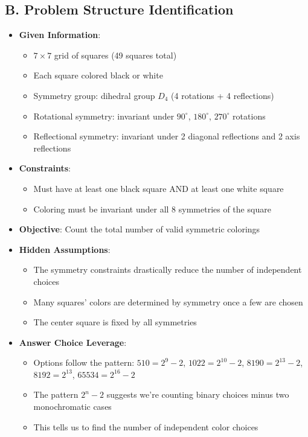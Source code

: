 \documentclass[]{article}
\begin{document}
\begin{problemconfigbox}
\subsection*{B. Problem Structure Identification}
\begin{itemize}[leftmargin=*]
    \item \textbf{Given Information}: 
    \begin{itemize}
        \item $7 \times 7$ grid of squares (49 squares total)
        \item Each square colored black or white
        \item Symmetry group: dihedral group $D_4$ (4 rotations + 4 reflections)
        \item Rotational symmetry: invariant under $90^{\circ}$, $180^{\circ}$, $270^{\circ}$ rotations
        \item Reflectional symmetry: invariant under 2 diagonal reflections and 2 axis reflections
    \end{itemize}
    \item \textbf{Constraints}: 
    \begin{itemize}
        \item Must have at least one black square AND at least one white square
        \item Coloring must be invariant under all 8 symmetries of the square
    \end{itemize}
    \item \textbf{Objective}: Count the total number of valid symmetric colorings
    \item \textbf{Hidden Assumptions}: 
    \begin{itemize}
        \item The symmetry constraints drastically reduce the number of independent choices
        \item Many squares' colors are determined by symmetry once a few are chosen
        \item The center square is fixed by all symmetries
    \end{itemize}
    \item \textbf{Answer Choice Leverage}: 
    \begin{itemize}
        \item Options follow the pattern: $510 = 2^9 - 2$, $1022 = 2^{10} - 2$, $8190 = 2^{13} - 2$, $8192 = 2^{13}$, $65534 = 2^{16} - 2$
        \item The pattern $2^n - 2$ suggests we're counting binary choices minus two monochromatic cases
        \item This tells us to find the number of independent color choices
    \end{itemize}
\end{itemize}


\end{problemconfigbox}
\end{document}
